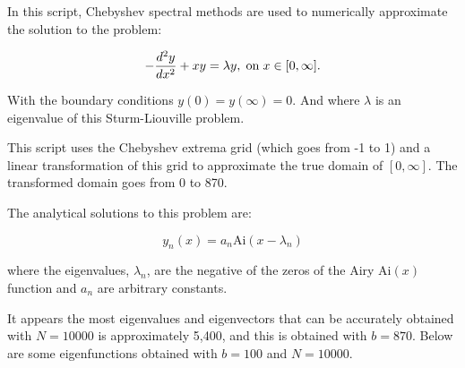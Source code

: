 \documentclass[12pt,a4paper,openright]{article}
\begin{document}
	In this script, Chebyshev spectral methods are used to numerically approximate the solution to the problem:

	\[
	- \dfrac{d^2 y}{dx^2} + xy = \lambda y, \hspace{0.1cm}\mathrm{on} \hspace{0.1cm} x\in[0,\infty].
	\]

	With the boundary conditions $y(0)=y(\infty)=0$. And where $\lambda$ is an eigenvalue of this Sturm-Liouville problem.

	This script uses the Chebyshev extrema grid (which goes from -1 to 1) and a linear transformation of this grid to approximate the true domain of $[0,\infty]$. The transformed domain goes from 0 to 870.

	The analytical solutions to this problem are:

	\[
	y_n(x) = a_n \mathrm{Ai}(x-\lambda_n)
	\]

	where the eigenvalues, $\lambda_n$, are the negative of the zeros of the Airy $\mathrm{Ai}(x)$ function and $a_n$ are arbitrary constants.

	It appears the most eigenvalues and eigenvectors that can be accurately obtained with $N=10000$ is approximately 5,400, and this is obtained with $b=870$. Below are some eigenfunctions obtained with $b=100$ and $N=10000$.
\end{document}
